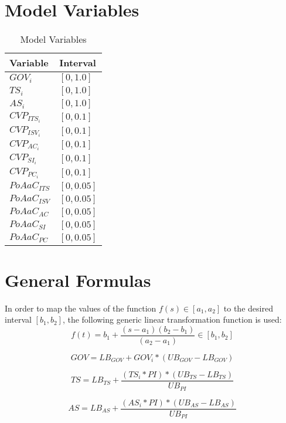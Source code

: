 \section{Model Variables}
\begin{table}[tbh]
	\centering
	\begin{tabular}{ll}
			\toprule 
			Variable & Interval\\ \midrule
			$GOV_i$ & $[0,1.0]$ \\
			$TS_i$ & $[0,1.0]$ \\
			$AS_i$ & $[0,1.0]$ \\ \midrule
			$CVP_{ITS_i}$ & $[0,0.1]$ \\
			$CVP_{ISV_i}$ & $[0,0.1]$ \\
			$CVP_{AC_i}$ & $[0,0.1]$ \\
			$CVP_{SI_i}$ & $[0,0.1]$ \\
			$CVP_{PC_i}$ & $[0,0.1]$ \\ \midrule
			$PoAaC_{ITS}$ & $[0,0.05]$ \\
			$PoAaC_{ISV}$ & $[0,0.05]$ \\
			$PoAaC_{AC}$ & $[0,0.05]$ \\
			$PoAaC_{SI}$ & $[0,0.05]$ \\
			$PoAaC_{PC}$ & $[0,0.05]$ \\ \bottomrule
	\end{tabular}
	\caption{Model Variables}
	\label{tab:mvar}
\end{table}

\newpage
\section{General Formulas}
In order to map the values of the function $f(s) \in [a_{1},a_{2}]$ to the desired interval $[b_{1},b_{2}]$, the following generic linear transformation function is used:
\begin{equation}\label{eq:ltg}
	f(t) = b_{1} + \frac{(s-a_{1})(b_{2}-b_{1})}{(a_{2}-a_{1})} \in [b_{1},b_{2}]
\end{equation}

\begin{equation}
	GOV = LB_{GOV} + GOV_{i} * (UB_{GOV} - LB_{GOV})
\end{equation}

\begin{equation}
	TS = LB_{TS} +  \frac{(TS_{i} * PI) * (UB_{TS} - LB_{TS})}{UB_{PI}}
\end{equation}

\begin{equation}
	AS = LB_{AS} +  \frac{(AS_{i} * PI) * (UB_{AS} - LB_{AS})}{UB_{PI}}
\end{equation}

